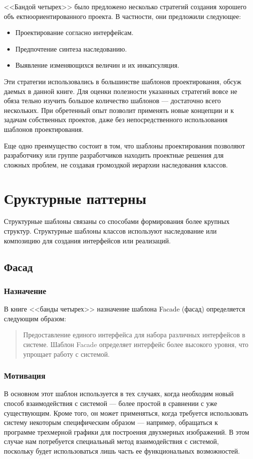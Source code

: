 \documentclass[10pt]{article}
\begin{document}
<<Бандой четырех>> было предложено несколько стратегий создания хорошего объ
ектноориентированного проекта. В частности, они предложили следующее:
\begin{itemize}
	\item Проектирование согласно интерфейсам.
	\item Предпочтение синтеза наследованию.
	\item Выявление изменяющихся величин и их инкапсуляция.
\end{itemize}

Эти стратегии использовались в большинстве шаблонов проектирования, обсуж
даемых в данной книге. Для оценки полезности указанных стратегий вовсе не обяза
тельно изучить большое количество шаблонов — достаточно всего нескольких. При
обретенный опыт позволит применять новые концепции и к задачам собственных
проектов, даже без непосредственного использования шаблонов проектирования.

Еще одно преимущество состоит в том, что шаблоны проектирования позволяют
разработчику или группе разработчиков находить проектные решения для сложных
проблем, не создавая громоздкой иерархии наследования классов.

\section{Сруктурные паттерны}
Структурные шаблоны связаны со способами формирования более крупных структур.
Структурные шаблоны классов используют наследование или композицию для создания интерфейсов или реализаций.
\subsection{Фасад}
\subsubsection{Назначение}
В книге <<банды четырех>> назначение шаблона Facade (фасад) определяется
следующим образом:
\begin{quote}
Предоставление единого интерфейса для набора различных интерфейсов в системе.
Шаблон Facade определяет интерфейс более высокого уровня, что упрощает
работу с системой.
\end{quote}
\subsubsection{Мотивация}
В основном этот шаблон используется в тех случаях, когда необходим новый
способ взаимодействия с системой --- более простой в сравнении с уже существующим.
Кроме того, он может применяться, когда требуется использовать систему некоторым
специфическим образом --- например, обращаться к программе трехмерной графики
для построения двухмерных изображений. В этом случае нам потребуется специальный
метод взаимодействия с системой, поскольку будет использоваться лишь часть ее
функциональных возможностей.
\end{document}
